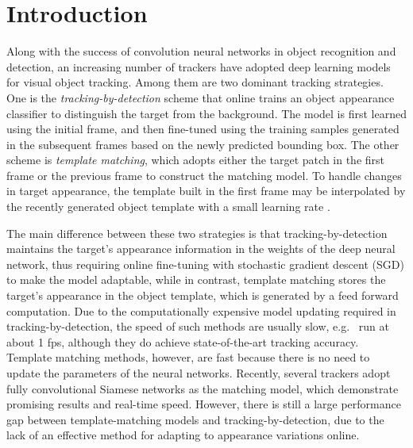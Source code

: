 \documentclass[runningheads]{llncs}
\begin{document}
\section{Introduction}

Along with the success of convolution neural networks in object recognition and detection,  an increasing number of trackers \cite{Song2017, Nam2016, Wang2015, Bertinetto2016, Guo2017} have adopted deep learning models for visual object tracking. Among them are two dominant tracking strategies. One is the {\em tracking-by-detection} scheme that online trains an object appearance classifier \cite{Song2017, Nam2016} to distinguish the target from the background. The model is first learned using the initial frame, and then fine-tuned using the training samples generated in the subsequent frames based on the newly predicted bounding box. The other scheme is {\em template matching}, which adopts either the target patch in the first frame \cite{Bertinetto2016, Tao2016} or the previous frame \cite{Held2016} to construct the matching model. To handle changes in target appearance, %
the template built in the first frame may be interpolated by the recently generated object template with a small learning rate \cite{Valmadre2017}.  

The main difference between these two strategies is that tracking-by-detection maintains the target's appearance information in the weights of the deep neural network, thus requiring online fine-tuning with stochastic gradient descent (SGD) to make the model adaptable,
while in contrast, template matching stores the target's appearance in the object template, which is generated by a feed forward computation.  Due to the computationally expensive model updating required in tracking-by-detection, the speed of such methods are usually slow, e.g.\ %
\cite{Song2017, Nam2016, Nam2016-1} run at about 1 fps,
although they do achieve state-of-the-art tracking accuracy. 
%
Template matching methods, however, are fast %
because there is no need to update the parameters of the neural networks. Recently, several trackers \cite{Bertinetto2016, Guo2017, Yang2017} adopt fully convolutional Siamese networks as the matching model, which demonstrate promising results and real-time speed.  However, there is still a large performance gap between template-matching models and tracking-by-detection, due to the lack of an effective method for adapting to appearance variations online.
\end{document}
